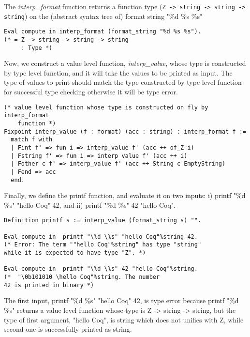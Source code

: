 \noindent
The \textit{interp\_format} function returns a function type 
(\texttt{Z -> string -> string -> string})  on the (abstract syntax tree of) 
format string "\%d \%s \%s" 

\begin{verbatim}
Eval compute in interp_format (format_string "%d %s %s").
(* = Z -> string -> string -> string
     : Type *)
\end{verbatim}

Now, we construct a value level function, \textit{interp\_value}, whose type 
is constructed by type level function, and it will take the values to be printed as input.
The type of values to print should match the type constructed by type level 
function for successful type checking otherwise it will be type error. 

\begin{verbatim}
(* value level function whose type is constructed on fly by interp_format 
    function *)
Fixpoint interp_value (f : format) (acc : string) : interp_format f :=
  match f with
  | Fint f' => fun i => interp_value f' (acc ++ of_Z i)
  | Fstring f' => fun i => interp_value f' (acc ++ i)
  | Fother c f' => interp_value f' (acc ++ String c EmptyString)
  | Fend => acc
  end.
\end{verbatim}

\noindent
Finally, we define the printf function, and evaluate it on two inputs: 
i)  printf "\%d \%s" "hello Coq" 42, and ii)  printf "\%d \%s" 42 "hello Coq".

\begin{verbatim}
Definition printf s := interp_value (format_string s) "".           

Eval compute in  printf "\%d \%s" "hello Coq"%string 42.
(* Error: The term ""hello Coq"%string" has type "string" 
while it is expected to have type "Z". *)

Eval compute in  printf "\%d \%s" 42 "hello Coq"%string. 
(*  "\0b101010 \hello Coq"%string. The number 
42 is printed in binary *)                            
\end{verbatim}
The first input, printf "\%d \%s" "hello Coq" 42, is type error because 
printf "\%d \%s" returns a value level function whose  type is Z -> string -> string, but 
the type of first argument, "hello Coq", is string which does not unifies with Z,
while second one is successfully printed as string. 

  
  

 

